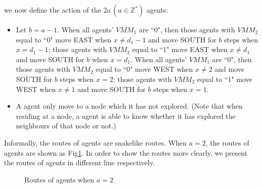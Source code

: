 we now define the action of the $2a\,(a\in\mathbb{Z}^*)$ agents:\\ 
\begin{itemize}
\item Let $b=a-1$. When all agents' $VMM_1$ are ``0", then those agents with $VMM_2$ equal to ``0" move EAST when $x\neq d_1-1$ and move SOUTH for $b$ steps when $x=d_1-1$; those agents with $VMM_2$ equal to ``1" move EAST when $x\neq d_1$ and move SOUTH for $b$ when $x=d_1$. When all agents' $VMM_1$ are ``0", then those agents with $VMM_2$ equal to ``0"  move WEST when $x\neq2$ and move SOUTH for $b$ steps when $x=2$; those agents with $VMM_2$ equal to ``1" move WEST when $x\neq 1$ and move SOUTH for $b$ steps when $x=1$.
\item A agent only move to a node which it has not explored. (Note that when residing at a node, a agent is able to know whether it has explored the neighbours of that node or not.)
\end{itemize}
Informally, the routes of agents are snakelike routes. When $a=2$, the routes of agents are shown as Fig\ref{fig:twoagent2}. In order to show the routes more clearly, we present the routes of agents in different line respectively.
\begin{figure} [H]
  \centering 
  \caption{Routes of agents when $a=2$} 
  \label{fig:twoagent2} %
\end{figure}
